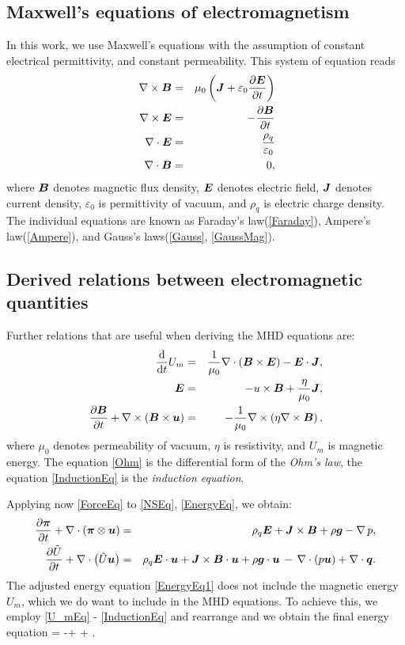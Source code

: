 \subsection{Maxwell's equations of electromagnetism}
In this work, we use Maxwell's equations with the assumption of constant electrical permittivity, and constant permeability. This system of equation reads
\begin{eqnarray}
\label{Ampere} \nabla \times \mbox{\boldmath $B$} & = & \mu_0 \left( \mbox{\boldmath $J$} + \varepsilon_0 \frac{\partial{\mbox{\boldmath $E$}}}{\partial{t}}\right)\\\
\label{Faraday} \nabla \times \mbox{\boldmath $E$} & = & -\frac{\partial{\mbox{\boldmath $B$}}}{\partial{t}}\\
\label{Gauss} \nabla \cdot \mbox{\boldmath $E$} & = & \frac{\rho_q}{\varepsilon_0}\\
\label{GaussMag} \nabla \cdot \mbox{\boldmath $B$} & = &0,
\end{eqnarray}
where $\mbox{\boldmath $B$}$ denotes magnetic flux density, $\mbox{\boldmath $E$}$ denotes electric field, $\mbox{\boldmath $J$}$ denotes current density, $\varepsilon_0$ is permittivity of vacuum, and $\rho_q$ is electric charge density.
The individual equations are known as Faraday's law(\ref{Faraday}), Ampere's law(\ref{Ampere}), and Gauss's laws(\ref{Gauss}, \ref{GaussMag}).


\subsection{Derived relations between electromagnetic quantities}
Further relations that are useful when deriving the MHD equations are:
\begin{eqnarray}
\label{U_mEq} \frac{\text{d}}{\text{d}t} U_m & = & \frac{1}{\mu_0}\nabla \cdot \left( \mbox{\boldmath $B$}\times\mbox{\boldmath $E$}\right) - \mbox{\boldmath $E$}\cdot\mbox{\boldmath $J$},\\
\label{Ohm} \mbox{\boldmath $E$} & = & -u \times \mbox{\boldmath $B$} + \frac{\eta}{\mu_0}\mbox{\boldmath $J$},\\
\label{InductionEq} \frac{\partial{\mbox{\boldmath $B$}}}{\partial{t}} + \nabla \times \left( \mbox{\boldmath $B$} \times \mbox{\boldmath $u$} \right) & = & -\frac{1}{\mu_0} \nabla \times \left( \eta \nabla \times \mbox{\boldmath $B$} \right),
\end{eqnarray}
where $\mu_0$ denotes permeability of vacuum, $\eta$ is resistivity, and $U_m$ is magnetic energy.
The equation \ref{Ohm} is the differential form of the \textit{Ohm's law}, the equation \ref{InductionEq} is the \textit{induction equation}.

Applying now \ref{ForceEq} to \ref{NSEq}, \ref{EnergyEq}, we obtain:
\begin{eqnarray}
\label{NSEq1} \frac{\partial{\mbox{\boldmath $\pi$}}}{\partial{t}} + \nabla\cdot\left(\mbox{\boldmath $\pi$}\otimes\mbox{\boldmath $u$}\right)& = & \rho_q\mbox{\boldmath $E$} + \mbox{\boldmath $J$}\times\mbox{\boldmath $B$} + \rho\mbox{\boldmath $g$} - \nabla\,p,\\
\label{EnergyEq1} \frac{\partial{\tilde{U}}}{\partial{t}} + \nabla\cdot\left({\tilde{U}}\mbox{\boldmath $u$}\right) & = & \rho_q\mbox{\boldmath $E$}\cdot\mbox{\boldmath $u$} + \mbox{\boldmath $J$}\times\mbox{\boldmath $B$}\cdot\mbox{\boldmath $u$} + \rho\mbox{\boldmath $g$}\cdot\mbox{\boldmath $u$} \,-\,\nabla\cdot\left({p}\mbox{\boldmath $u$}\right) + \nabla\cdot\mbox{\boldmath $q$}.
\end{eqnarray}
The adjusted energy equation \ref{EnergyEq1} does not include the magnetic energy $U_m$, which we do want to include in the MHD equations. To achieve this, we employ \ref{U_mEq} - \ref{InductionEq} and rearrange and we obtain the final energy equation
\be
\label{EnergyEqPrefinal}  = -\nabla\cdot{} + \rho \bfg \cdot \bfu + \nabla\cdot\bfq.
\ee

